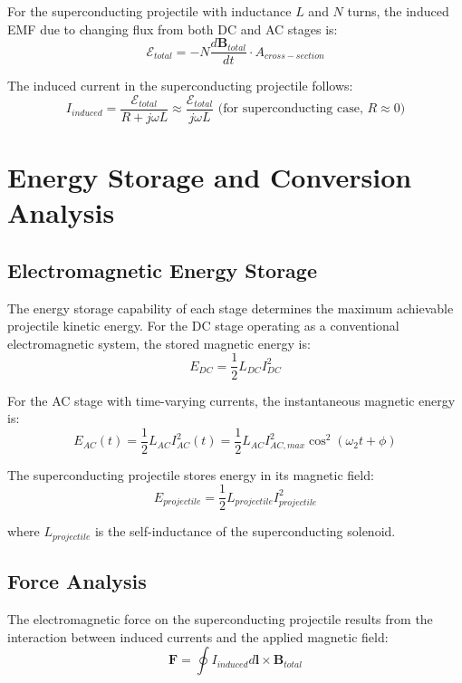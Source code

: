 \documentclass[12pt,a4paper]{article}
\begin{document}
For the superconducting projectile with inductance $L$ and $N$ turns, the induced EMF due to changing flux from both DC and AC stages is:
\begin{equation}
\mathcal{E}_{total} = -N \frac{d\mathbf{B}_{total}}{dt} \cdot A_{cross-section}
\end{equation}

The induced current in the superconducting projectile follows:
\begin{equation}
I_{induced} = \frac{\mathcal{E}_{total}}{R + j\omega L} \approx \frac{\mathcal{E}_{total}}{j\omega L} \text{ (for superconducting case, } R \approx 0\text{)}
\end{equation}

\section{Energy Storage and Conversion Analysis}

\subsection{Electromagnetic Energy Storage}

The energy storage capability of each stage determines the maximum achievable projectile kinetic energy. For the DC stage operating as a conventional electromagnetic system, the stored magnetic energy is:
\begin{equation}
E_{DC} = \frac{1}{2}L_{DC}I_{DC}^2
\end{equation}

For the AC stage with time-varying currents, the instantaneous magnetic energy is:
\begin{equation}
E_{AC}(t) = \frac{1}{2}L_{AC}I_{AC}^2(t) = \frac{1}{2}L_{AC}I_{AC,max}^2\cos^2(\omega_2 t + \phi)
\end{equation}

The superconducting projectile stores energy in its magnetic field:
\begin{equation}
E_{projectile} = \frac{1}{2}L_{projectile}I_{projectile}^2
\end{equation}

where $L_{projectile}$ is the self-inductance of the superconducting solenoid.

\subsection{Force Analysis}

The electromagnetic force on the superconducting projectile results from the interaction between induced currents and the applied magnetic field:
\begin{equation}
\mathbf{F} = \oint I_{induced} d\mathbf{l} \times \mathbf{B}_{total}
\end{equation}
\end{document}
